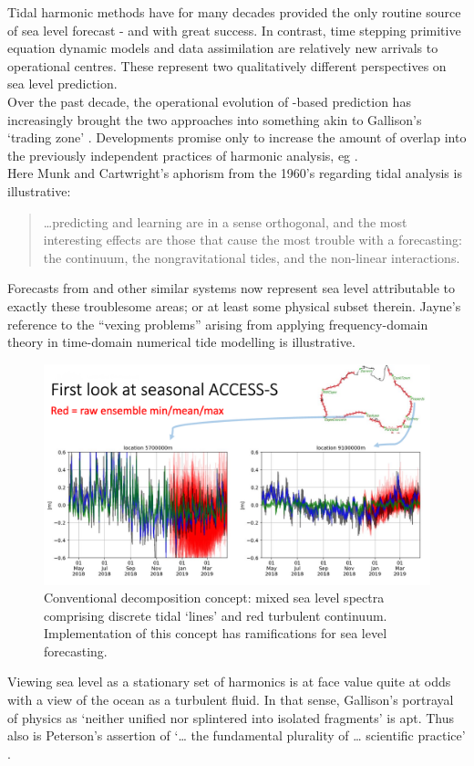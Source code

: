 Tidal harmonic methods have for many decades provided the only routine source of sea level forecast - and with great success.  
In contrast, time stepping primitive equation dynamic models and data assimilation are relatively new arrivals to operational centres.  
These represent two qualitatively different perspectives on sea level prediction.\\



Over the past decade, the operational evolution of \OGCM-based prediction has increasingly brought the two approaches into something akin to Gallison's `trading zone' \citep{Galison:1996uc}.
Developments promise only to increase the amount of overlap into the previously independent practices of harmonic analysis, eg \cite{Arbic:2010us}.\\
Here Munk and Cartwright's aphorism from the 1960's regarding tidal analysis is illustrative:
\begin{quote}
\dots predicting and learning are in a sense orthogonal, and the most interesting effects are those that cause the most trouble with a forecasting: the continuum, the nongravitational tides, and the non-linear interactions.\citep{Munk:1966ts} 
\end{quote}
Forecasts from \BL{} and other similar systems now represent sea level attributable to exactly these troublesome areas; or at least some physical subset therein.
Jayne's reference to the ``vexing problems'' \citep[pp812]{Jayne:2001tr} arising from applying frequency-domain theory in time-domain numerical tide modelling is illustrative.


\begin{figure}[h]
\begin{center}
\includegraphics[width=120mm]{figures/images/spectra_cartoon_1.png}
\caption{Conventional decomposition concept: mixed sea level spectra comprising discrete tidal `lines' and red turbulent continuum.  Implementation of this concept has ramifications for sea level forecasting.}
\label{fig:SPECTRA_CARTOON}
\end{center}
\end{figure}


Viewing sea level as a stationary set of harmonics is at face value quite at odds with a view of the ocean as a turbulent fluid.   In that sense, Gallison's portrayal of physics as `neither unified nor splintered into isolated fragments' \citep[pp 782]{Galison:1987wh} is apt.  Thus also is Peterson's assertion of `\dots{} the fundamental plurality of \dots{} scientific practice' \cite{Petersen:2012tr}. 
